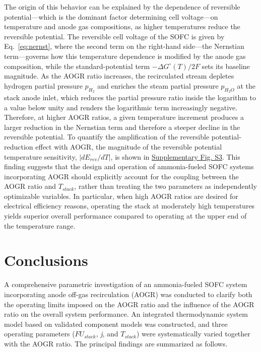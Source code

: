 \documentclass[a4paper,10pt]{cas-dc} %
\begin{document}
The origin of this behavior can be explained by the dependence of reversible potential---which is the dominant factor determining cell voltage---on temperature and anode gas compositions, as higher temperatures reduce the reversible potential.
The reversible cell voltage of the SOFC is given by Eq.~\eqref{eq:nernst}, where the second term on the right-hand side---the Nernstian term---governs how this temperature dependence is modified by the anode gas composition, while the standard-potential term \(-\Delta G^{\circ}(T)/2F\) sets its baseline magnitude.
As the AOGR ratio increases, the recirculated stream depletes hydrogen partial pressure \(p_{H_{2}}\) and enriches the steam partial pressure \(p_{H_{2}O}\) at the stack anode inlet, which reduces the partial pressure ratio inside the logarithm to a value below unity and renders the logarithmic term increasingly negative.
Therefore, at higher AOGR ratios, a given temperature increment produces a larger reduction in the Nernstian term and therefore a steeper decline in the reversible potential.
To quantify the amplification of the reversible potential-reduction effect with AOGR, the magnitude of the reversible potential temperature sensitivity, \(\left|dE_{rev}/dT\right|\), is shown in \href{Supplementary.pdf}{Supplementary Fig. S3}.
This finding suggests that the design and operation of ammonia-fueled SOFC systems incorporating AOGR should explicitly account for the coupling between the AOGR ratio and \(T_{stack}\), rather than treating the two parameters as independently optimizable variables.
In particular, when high AOGR ratios are desired for electrical efficiency reasons, operating the stack at moderately high temperatures yields superior overall performance compared to operating at the upper end of the temperature range.

\section{Conclusions}

A comprehensive parametric investigation of an ammonia-fueled SOFC system incorporating anode off-gas recirculation (AOGR) was conducted to clarify both the operating limits imposed on the AOGR ratio and the influence of the AOGR ratio on the overall system performance.
An integrated thermodynamic system model based on validated component models was constructed, and three operating parameters (\({FU}_{stack}\), \emph{j}, and \(T_{stack}\)) were systematically varied together with the AOGR ratio.
The principal findings are summarized as follows.
\end{document}
